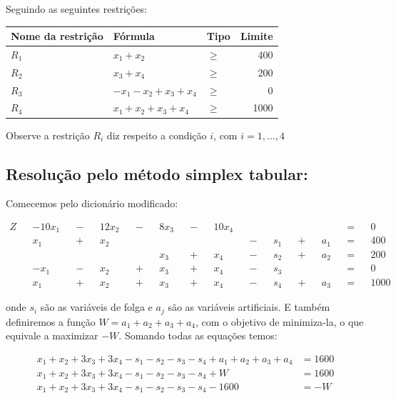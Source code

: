 \documentclass[12pt, a4paper]{article}
\begin{document}
Seguindo as seguintes restrições:

\begin{table}[htb]
  \centering
  \begin{tabular}{lllr}
    \toprule
    Nome da restrição & Fórmula & Tipo & Limite \\
    \midrule
    $R_1$ & $x_1 + x_2$ & $\ge$ & 400 \\
    $R_2$ & $x_3 + x_4$ & $\ge$ & 200 \\
    $R_3$ & $-x_1 -x_2 + x_3 + x_4$ & $\ge$ & 0 \\
    $R_4$ & $x_1 + x_2 + x_3 + x_4$ & $\ge$ & 1000 \\
    \bottomrule
  \end{tabular}
\end{table}

Observe a restrição $R_i$ diz respeito a condição $i$, com $i = 1, \ldots, 4$

\subsection[Método simplex tabular]{Resolução pelo método simplex tabular:}

Comecemos pelo dicionário modificado:

\begin{align*}
  Z &&- 10x_1 &&-&& 12x_2 &&-&& 8x_3 &&-&& 10x_4 && && && && &&=&& 0 \\
  && x_1 &&+&& x_2 && && && && &&-&& s_1 &&+&& a_1 &&=&& 400 \\
  && && && && && x_3 &&+&& x_4 &&-&& s_2 &&+&& a_2 &&=&& 200 \\
  &&-x_1 &&-&& x_2 &&+&& x_3 &&+&& x_4 &&-&& s_3 && && &&=&& 0 \\
  && x_1 &&+&& x_2 &&+&& x_3 &&+&& x_4 &&-&& s_4 &&+&& a_3 &&=&& 1000
\end{align*}

onde $s_i$ são as variáveis de folga e $a_j$ são as variáveis artificiais. E também definiremos a função $W = a_1 + a_2 + a_3 + a_4$, com o objetivo de minimiza-la, o que equivale a maximizar $-W$. Somando todas as equações temos:

\begin{align*}
  x_1 + x_2 + 3x_3 + 3x_4 - s_1 - s_2 - s_3 - s_4 + a_1 + a_2 + a_3 + a_4 &= 1600 \\
  x_1 + x_2 + 3x_3 + 3x_4 - s_1 - s_2 - s_3 - s_4 + W &= 1600 \\
  x_1 + x_2 + 3x_3 + 3x_4 - s_1 - s_2 - s_3 - s_4 - 1600 &= -W
\end{align*}
\end{document}
